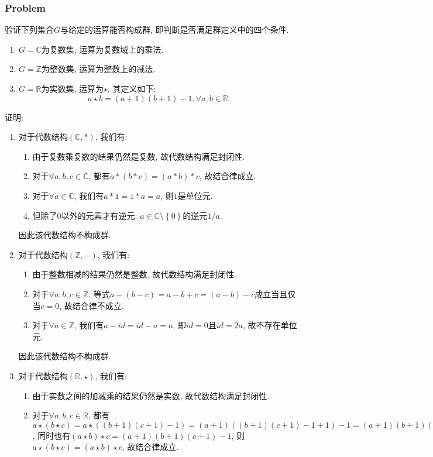 \documentclass[a4paper,12pt]{ctexart}
\begin{document}
\subsubsection*{Problem}
    验证下列集合$G$与给定的运算能否构成群, 即判断是否满足群定义中的四个条件.
    \begin{enumerate}[label=(\arabic{*})]
        \item $G=\mathbb{C}$为复数集, 运算为复数域上的乘法.
        \item $G=\mathbb{Z}$为整数集, 运算为整数上的减法.
        \item $G=\mathbb{R}$为实数集, 运算为$\star$, 其定义如下: \[a\star b=(a+1)(b+1)-1,\forall a,b\in \mathbb{R}.\]
    \end{enumerate}

    证明: 
    \begin{enumerate}[label=(\arabic{*})]
        \item 对于代数结构$(\mathbb{C},*)$, 我们有:
        \begin{enumerate}
            \item 由于复数乘复数的结果仍然是复数, 故代数结构满足封闭性.
            \item 对于$\forall a,b,c\in\mathbb{C}$, 都有$a*(b*c)=(a*b)*c$, 故结合律成立.
            \item 对于$\forall a\in\mathbb{C}$, 我们有$a*1=1*a=a$, 则$1$是单位元.
            \item 但除了$0$以外的元素才有逆元: $a\in\mathbb{C}\setminus\left\{ 0 \right\}$的逆元$1/a$.
        \end{enumerate} 
        因此该代数结构不构成群.
        \item 对于代数结构$(\mathbb{Z},-)$, 我们有:
        \begin{enumerate}
            \item 由于整数相减的结果仍然是整数, 故代数结构满足封闭性.
            \item 对于$\forall a,b,c\in\mathbb{Z}$, 等式$a-(b-c)=a-b+c=(a-b)-c$成立当且仅当$c=0$, 故结合律不成立.
            \item 对于$\forall a\in\mathbb{Z}$, 我们有$a-id=id-a=a$, 即$id=0$且$id=2a$, 故不存在单位元.
        \end{enumerate} 
        因此该代数结构不构成群.
        \item 对于代数结构$(\mathbb{R},\star)$, 我们有:
        \begin{enumerate}
            \item 由于实数之间的加减乘的结果仍然是实数, 故代数结构满足封闭性.
            \item 对于$\forall a,b,c\in\mathbb{R}$, 都有$a\star(b\star c)=a\star\left( (b+1)(c+1)-1 \right)=(a+1)\left( (b+1)(c+1)-1 +1\right)-1=(a+1)(b+1)(c+1)-1$, 同时也有$(a\star b)\star c=(a+1)(b+1)(c+1)-1$, 则$a\star(b\star c)=(a\star b)\star c$, 故结合律成立.

\end{enumerate}
\end{enumerate}
\end{document}
